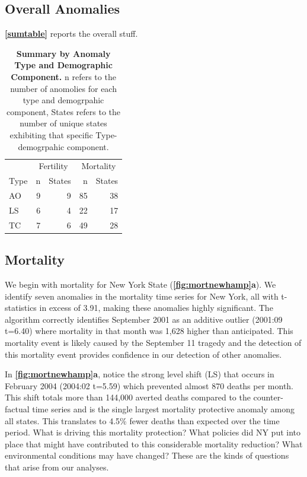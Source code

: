 \documentclass[12pt]{article}
\begin{document}
\hypertarget{overall-anomalies}{%
\subsection{Overall Anomalies}\label{overall-anomalies}}

\textbf{\autoref{sumtable}} reports the overall stuff.

\begin{table}

\caption{\label{tab:unnamed-chunk-1}\textbf{Summary by Anomaly Type and Demographic Component.} n refers to the number of anomolies for each type and demogrpahic component, States refers to the number of unique states exhibiting that specific Type-demogrpahic component. \label{sumtable}}
\centering
\begin{tabular}[t]{lrrrr}
\toprule
\multicolumn{1}{c}{ } & \multicolumn{2}{c}{Fertility} & \multicolumn{2}{c}{Mortality} \\
\cmidrule(l{3pt}r{3pt}){2-3} \cmidrule(l{3pt}r{3pt}){4-5}
Type & n & States & n & States\\
\midrule
AO & 9 & 9 & 85 & 38\\
LS & 6 & 4 & 22 & 17\\
TC & 7 & 6 & 49 & 28\\
\bottomrule
\end{tabular}
\end{table}

\hypertarget{mortality}{%
\subsection{Mortality}\label{mortality}}

We begin with mortality for New York State
(\textbf{\autoref{fig:mortnewhamp}a}). We identify seven anomalies in
the mortality time series for New York, all with t-statistics in excess
of 3.91, making these anomalies highly significant. The algorithm
correctly identifies September 2001 as an additive outlier (2001:09
t=6.40) where mortality in that month was 1,628 higher than anticipated.
This mortality event is likely caused by the September 11 tragedy and
the detection of this mortality event provides confidence in our
detection of other anomalies.

In \textbf{\autoref{fig:mortnewhamp}a}, notice the strong level shift
(LS) that occurs in February 2004 (2004:02 t=5.59) which prevented
almost 870 deaths per month. This shift totals more than 144,000 averted
deaths compared to the counter-factual time series and is the single
largest mortality protective anomaly among all states. This translates
to 4.5\% fewer deaths than expected over the time period. What is
driving this mortality protection? What policies did NY put into place
that might have contributed to this considerable mortality reduction?
What environmental conditions may have changed? These are the kinds of
questions that arise from our analyses.
\end{document}
